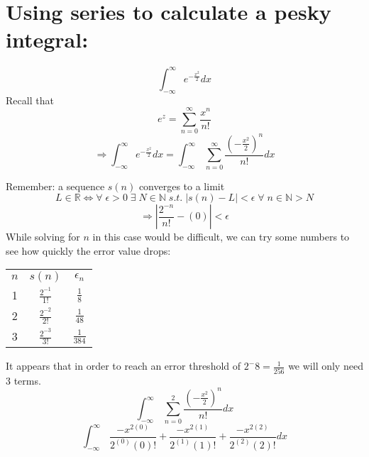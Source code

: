 \documentclass{article}
\begin{document}
\section{Using series to calculate a pesky integral:}
    \[\int _{-\infty }^{\infty \:}e^{-\frac{x^2}{2}}dx\]
    Recall that
    \[e^z= \sum_{n=0}^{\infty}\frac{x^n}{n!}\]
    \[\Rightarrow \int _{-\infty }^{\infty \:}e^{-\frac{x^2}{2}}dx=\int _{-\infty \:}^{\infty \:\:}\sum_{n=0}^{\infty}\frac{(-\frac{x^2}{2})^n}{n!} dx \]

    Remember: a sequence $s(n)$ converges to a limit
    \[L \in\mathbb{R}\iff\forall \; \epsilon > 0  \; \exists \; N \in \mathbb{N} \; s.t. \; |s(n) - L| < \epsilon \; \forall \; n \in \mathbb{N} > N\]
    \[ \Rightarrow |\frac{2^{-n}}{n!} - (0)| < \epsilon\]
    While solving for $n$ in this case would be difficult, we can try some numbers to see how quickly the error value drops:
    \begin{center}
     \begin{tabular}{||c | c | c||}
     \hline
     $n$ & $s(n)$ & $\epsilon_n$ \\ [0.5ex]
     1 & $\frac{2^{-1}}{1!}$ & $\frac{1}{8}$ \\
     2 & $\frac{2^{-2}}{2!}$ & $\frac{1}{48}$ \\
     3 & $\frac{2^{-3}}{3!}$ & $\frac{1}{384}$ \\ [1ex]
     \hline
    \end{tabular}
    \end{center}
    It appears that in order to reach an error threshold of $2^-8 = \frac{1}{256}$ we will only need 3 terms.
    \[\int _{-\infty \:}^{\infty \:\:}\sum_{n=0}^{2}\frac{(-\frac{x^2}{2})^n}{n!} dx \]
    \[\int _{-\infty \:}^{\infty \:\:}\frac{-x^{2(0)}}{2^{(0)}(0)!}+\frac{-x^{2(1)}}{2^{(1)}(1)!}+\frac{-x^{2(2)}}{2^{(2)}(2)!} dx \]
\end{document}
